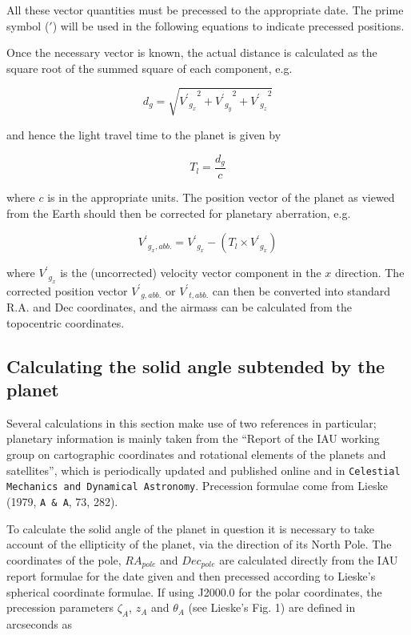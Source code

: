 \documentclass[11pt,twoside]{article}
\newcommand{\xlabel}[1]{}
\renewcommand{\_}{\texttt{\symbol{95}}}
\begin{document}
All these vector quantities must be precessed to the appropriate date. The prime symbol ($\prime$) will be used in the following equations to indicate precessed positions.

Once the necessary vector is known, the actual distance is calculated as the square root of the summed square of each component, e.g.

\begin{displaymath}
d_g = \sqrt{{{{V^\prime}_{g_x}}^2} + {{{V^\prime}_{g_y}}^2} + {{{V^\prime}_{g_z}}^2}}
\end{displaymath}

and hence the light travel time to the planet is given by

\begin{displaymath}
T_l = \frac{d_g}{c}
\end{displaymath}

where $c$ is in the appropriate units.  The position vector of the planet as viewed from the Earth should then be corrected for planetary aberration, e.g.

\begin{displaymath}
{V^\prime}_{g_x, abb.} = {V^\prime}_{g_x} - (T_l \times {V^\prime}_{g_{\dot{x}}})
\end{displaymath}

where ${V^\prime}_{g_{\dot{x}}}$ is the (uncorrected) velocity vector component in the $x$ direction.  The corrected position vector ${V^\prime}_{g, abb.}$ or ${V^\prime}_{t, abb.}$ can then be converted into standard R.A. and Dec coordinates, and the airmass can be calculated from the topocentric coordinates.

\subsection{Calculating the solid angle subtended by the planet}
\xlabel{solidangle}
\label{sec:solidangle}

Several calculations in this section make use of two references in particular; planetary information is mainly taken from the ``Report of the IAU working group on cartographic coordinates and rotational elements of the planets and satellites'', which is periodically updated and published online and in {\tt{Celestial Mechanics and Dynamical Astronomy}}.  Precession formulae come from Lieske (1979, {\tt{A \& A}}, 73, 282).

To calculate the solid angle of the planet in question it is necessary to take account of the ellipticity of the planet, via the direction of its North Pole.  The coordinates of the pole, $RA_{pole}$ and $Dec_{pole}$ are calculated directly from the IAU report formulae for the date given and then precessed according to Lieske's spherical coordinate formulae.  If using J2000.0 for the polar coordinates, the precession parameters $\zeta_A$, $z_A$ and $\theta_A$ (see Lieske's Fig. 1) are defined in arcseconds as
\end{document}
